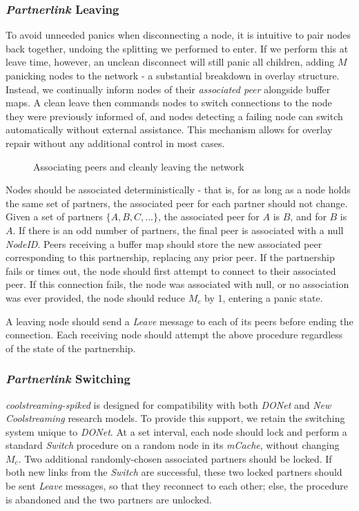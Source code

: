 \documentclass[12pt,a4paper]{article}
\begin{document}
\subsubsection{\textit{Partnerlink} Leaving} \label{css:partnerlink:leaving}
To avoid unneeded panics when disconnecting a node, it is intuitive to pair nodes back together, undoing the splitting we performed to enter. If we perform this at leave time, however, an unclean disconnect will still panic all children, adding \(M\) panicking nodes to the network - a substantial breakdown in overlay structure. Instead, we continually inform nodes of their \textit{associated peer} alongside buffer maps. A clean leave then commands nodes to switch connections to the node they were previously informed of, and nodes detecting a failing node can switch automatically without external assistance. This mechanism allows for overlay repair without any additional control in most cases.

\begin{figure}[!ht]
	\centering
	\resizebox{0.8\textwidth}{!}{%
		
	}%
	\caption{Associating peers and cleanly leaving the network}
	\label{panic}
\end{figure}

Nodes should be associated deterministically - that is, for as long as a node holds the same set of partners, the associated peer for each partner should not change. Given a set of partners \(\{A, B, C, ...\}\), the associated peer for \(A\) is \(B\), and for \(B\) is \(A\). If there is an odd number of partners, the final peer is associated with a null \textit{NodeID}. Peers receiving a buffer map should store the new associated peer corresponding to this partnership, replacing any prior peer. If the partnership fails or times out, the node should first attempt to connect to their associated peer. If this connection fails, the node was associated with null, or no association was ever provided, the node should reduce \(M_c\) by 1, entering a panic state.

A leaving node should send a \textit{Leave} message to each of its peers before ending the connection. Each receiving node should attempt the above procedure regardless of the state of the partnership.

\subsubsection{\textit{Partnerlink} Switching} \label{css:partnerlink:switching}
\textit{coolstreaming-spiked} is designed for compatibility with both \textit{DONet} and \textit{New Coolstreaming} research models. To provide this support, we retain the switching system unique to \textit{DONet}. At a set interval, each node should lock and perform a standard \textit{Switch} procedure on a random node in its \textit{mCache}, without changing \(M_c\). Two additional randomly-chosen associated partners should be locked. If both new links from the \textit{Switch} are successful, these two locked partners should be sent \textit{Leave} messages, so that they reconnect to each other; else, the procedure is abandoned and the two partners are unlocked.
\end{document}
